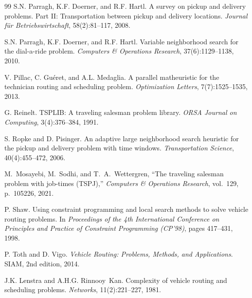 \documentclass{article}
\begin{document}
\begin{thebibliography}{99}
S.N. Parragh, K.F. Doerner, and R.F. Hartl.
A survey on pickup and delivery problems. {Part II}: Transportation between pickup and delivery locations.
{\em Journal f{\"u}r Betriebswirtschaft}, 58(2):81--117, 2008.

S.N. Parragh, K.F. Doerner, and R.F. Hartl.
Variable neighborhood search for the dial-a-ride problem.
{\em Computers \& Operations Research}, 37(6):1129--1138, 2010.

V. Pillac, C. Gu\'{e}ret, and A.L. Medaglia.
A parallel matheuristic for the technician routing and scheduling problem.
{\em Optimization Letters}, 7(7):1525--1535, 2013.

G. Reinelt.
TSPLIB: A traveling salesman problem library.
{\em ORSA Journal on Computing}, 3(4):376--384, 1991.

S. Ropke and D. Pisinger.
An adaptive large neighborhood search heuristic for the pickup and delivery problem with time windows.
{\em Transportation Science}, 40(4):455--472, 2006.

M.~Mosayebi, M.~Sodhi, and T.~A.~Wettergren,
``The traveling salesman problem with job-times (TSPJ),''
\emph{Computers \& Operations Research}, vol.~129, p.~105226, 2021.


P. Shaw.
Using constraint programming and local search methods to solve vehicle routing problems.
In {\em Proceedings of the 4th International Conference on Principles and Practice of Constraint Programming (CP'98)}, pages 417--431, 1998.

P. Toth and D. Vigo.
{\em Vehicle Routing: Problems, Methods, and Applications}.
SIAM, 2nd edition, 2014.

J.K. Lenstra and A.H.G. Rinnooy~Kan.
Complexity of vehicle routing and scheduling problems.
{\em Networks}, 11(2):221--227, 1981.

\end{thebibliography}
\end{document}
